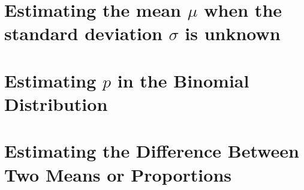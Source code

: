 \documentclass{ccg-topic}
\begin{document}
\newpage
\section{Estimating the mean $\mu$ when the standard deviation $\sigma$ is unknown}


\newpage
\section{Estimating $p$ in the Binomial Distribution}


\newpage
\section{Estimating the Difference Between Two Means or Proportions}

\end{document}
